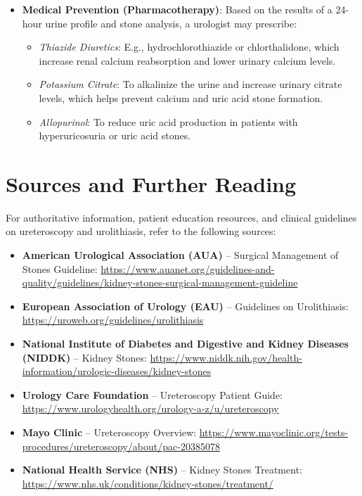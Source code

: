 \begin{itemize}
\begin{itemize}
  \item \textit{Protein Moderation}: Limit intake of animal proteins (red meat, poultry, fish), which can lower urinary pH and citrate levels while increasing uric acid excretion.
  \end{itemize}
\item \textbf{Medical Prevention (Pharmacotherapy)}: Based on the results of a 24-hour urine profile and stone analysis, a urologist may prescribe:
  \begin{itemize}
  \item \textit{Thiazide Diuretics}: E.g., hydrochlorothiazide or chlorthalidone, which increase renal calcium reabsorption and lower urinary calcium levels.
  \item \textit{Potassium Citrate}: To alkalinize the urine and increase urinary citrate levels, which helps prevent calcium and uric acid stone formation.
  \item \textit{Allopurinol}: To reduce uric acid production in patients with hyperuricosuria or uric acid stones.
  \end{itemize}
\end{itemize}

\section*{Sources and Further Reading}
For authoritative information, patient education resources, and clinical guidelines on ureteroscopy and urolithiasis, refer to the following sources:
\begin{itemize}
\item \textbf{American Urological Association (AUA)} -- Surgical Management of Stones Guideline: \url{https://www.auanet.org/guidelines-and-quality/guidelines/kidney-stones-surgical-management-guideline}
\item \textbf{European Association of Urology (EAU)} -- Guidelines on Urolithiasis: \url{https://uroweb.org/guidelines/urolithiasis}
\item \textbf{National Institute of Diabetes and Digestive and Kidney Diseases (NIDDK)} -- Kidney Stones: \url{https://www.niddk.nih.gov/health-information/urologic-diseases/kidney-stones}
\item \textbf{Urology Care Foundation} -- Ureteroscopy Patient Guide: \url{https://www.urologyhealth.org/urology-a-z/u/ureteroscopy}
\item \textbf{Mayo Clinic} -- Ureteroscopy Overview: \url{https://www.mayoclinic.org/tests-procedures/ureteroscopy/about/pac-20385078}
\item \textbf{National Health Service (NHS)} -- Kidney Stones Treatment: \url{https://www.nhs.uk/conditions/kidney-stones/treatment/}
\end{itemize}